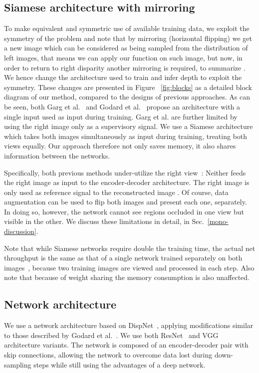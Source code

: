\documentclass[10pt,twocolumn,letterpaper]{article}
\begin{document}
\subsection{Siamese architecture with mirroring}
To make equivalent and symmetric use of available training data, we exploit the symmetry of the problem and note that by mirroring (horizontal flipping)  we get a new image  which can be considered as being sampled from the distribution of left images, that means we can apply our  function on such image, but now, in order to return to right disparity another mirroring is required, to summarize . We hence change the architecture used to train and infer depth to exploit the symmetry. These changes are presented in Figure ~\ref{fig:blocks} as a detailed block diagram of our method, compared to the designs of previous approaches. As can be seen, both Garg et al.~\cite{garg2016unsupervised} and Godard et al.~\cite{monodepth17} propose an architecture with a single input used as input during training. Garg et al. are further limited by using the right image only as a supervisory signal. We use a Siamese architecture which takes both images simultaneously as input during training, treating both views equally. Our approach therefore not only saves memory, it also shares information between the networks.

Specifically, both previous methods under-utilize the right view~\cite{garg2016unsupervised,monodepth17}: Neither feeds the right image as input to the encoder-decoder architecture. The right image is only used as reference signal to the reconstructed image . Of course, data augmentation can be used to flip both images and present each one, separately. In doing so, however, the network cannot see regions occluded in one view but visible in the other. We discuss these limitations in detail, in Sec.~\ref{mono-discussion}.

Note that while Siamese networks require double the training time, the actual net throughput is the same as that of a single network trained separately on both images~\cite{garg2016unsupervised,monodepth17}, because two training images are viewed and processed in each step. Also note that because of weight sharing the memory consumption is also unaffected.

\subsection{Network architecture}\label{sec:architecture}
We use a network architecture based on DispNet~\cite{MIFDB16}, applying modifications similar to those described by Godard et al.~\cite{monodepth17}. We use both ResNet~\cite{he2016deep} and VGG~\cite{simonyan2014very} architecture variants. The network is composed of an encoder-decoder pair with skip connections, allowing the network to overcome data lost during down-sampling steps while still using the advantages of a deep network.
\end{document}
